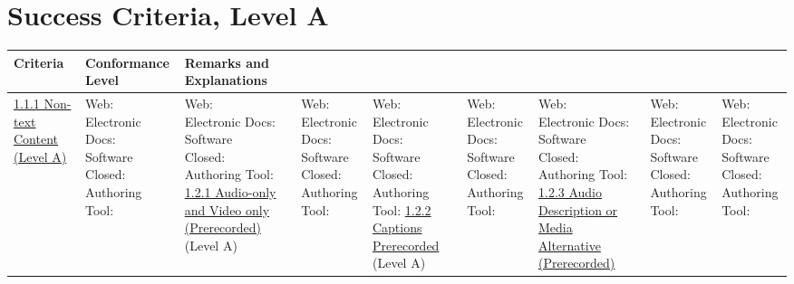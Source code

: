 \documentclass[a4paper]{report}
\begin{document}
\section{Success Criteria, Level A}
\begin{longtable}{|l|l|l|}
    \hline
	Criteria & Conformance Level & Remarks and Explanations \\
	\hline
	\href{https://www.w3.org/TR/WCAG20/#text-equiv-all}{1.1.1 Non-text Content (Level A)} &
 	\makecell{Web: \\ Electronic Docs: \\ Software \\ Closed: \\ Authoring Tool:} & \makecell{Web: \\ Electronic Docs: \\ Software \\ Closed: \\ Authoring Tool:}
 	\hline
 	\href{https://www.w3.org/TR/WCAG20/#media-equiv-av-only-alt}{1.2.1 Audio-only and Video only (Prerecorded)}(Level A) &
 	\makecell{Web: \\ Electronic Docs: \\ Software \\ Closed: \\ Authoring Tool:} & \makecell{Web: \\ Electronic Docs: \\ Software \\ Closed: \\ Authoring Tool:} 
 	\hline
 	\href{https://www.w3.org/TR/WCAG20/#media-equiv-captions}{1.2.2 Captions Prerecorded} (Level A) &
 	\makecell{Web: \\ Electronic Docs: \\ Software \\ Closed: \\ Authoring Tool:} & \makecell{Web: \\ Electronic Docs: \\ Software \\ Closed: \\ Authoring Tool:} 
 	\hline
 	\href{http://www.w3.org/TR/WCAG20/#media-equiv-audio-desc}{1.2.3 Audio Description or Media Alternative (Prerecorded)} &
 	\makecell{Web: \\ Electronic Docs: \\ Software \\ Closed: \\ Authoring Tool:} & \makecell{Web: \\ Electronic Docs: \\ Software \\ Closed: \\ Authoring Tool:}

\end{longtable}
\end{document}
